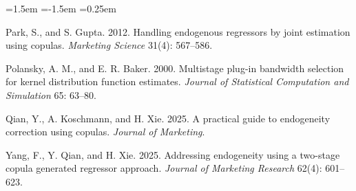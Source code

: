 \documentclass[11pt]{article}
\begin{document}
\begin{list}{}{\leftmargin=1.5em \itemindent=-1.5em \itemsep=0.25em}
\item Park, S., and S. Gupta. 2012. Handling endogenous regressors by joint
estimation using copulas. \emph{Marketing Science} 31(4): 567--586.

\item Polansky, A. M., and E. R. Baker. 2000. Multistage plug-in bandwidth
selection for kernel distribution function estimates. \emph{Journal of
Statistical Computation and Simulation} 65: 63--80.

\item Qian, Y., A. Koschmann, and H. Xie. 2025. A practical guide to
endogeneity correction using copulas. \emph{Journal of Marketing}.

\item Yang, F., Y. Qian, and H. Xie. 2025. Addressing endogeneity using a
two-stage copula generated regressor approach. \emph{Journal of Marketing
Research} 62(4): 601--623.

\end{list}
\end{document}
